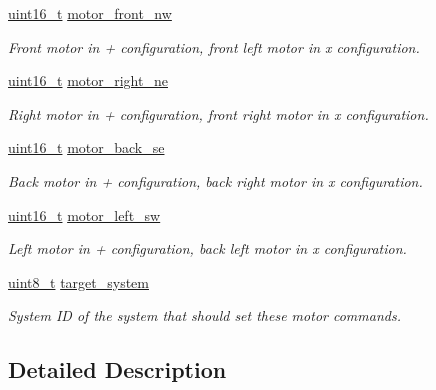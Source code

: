 \begin{DoxyCompactItemize}
\item 
\hyperlink{stdint_8h_a273cf69d639a59973b6019625df33e30}{uint16\-\_\-t} \hyperlink{struct____mavlink__set__quad__motors__setpoint__t_abc4491406798b03d54eec9ef0f4bd5d1}{motor\-\_\-front\-\_\-nw}
\begin{DoxyCompactList}\small\item\em Front motor in + configuration, front left motor in x configuration. \end{DoxyCompactList}\item 
\hyperlink{stdint_8h_a273cf69d639a59973b6019625df33e30}{uint16\-\_\-t} \hyperlink{struct____mavlink__set__quad__motors__setpoint__t_add9189ea075924d28bb0a4c04c04fcee}{motor\-\_\-right\-\_\-ne}
\begin{DoxyCompactList}\small\item\em Right motor in + configuration, front right motor in x configuration. \end{DoxyCompactList}\item 
\hyperlink{stdint_8h_a273cf69d639a59973b6019625df33e30}{uint16\-\_\-t} \hyperlink{struct____mavlink__set__quad__motors__setpoint__t_af5975aa67474104310c00bfba17f9dc1}{motor\-\_\-back\-\_\-se}
\begin{DoxyCompactList}\small\item\em Back motor in + configuration, back right motor in x configuration. \end{DoxyCompactList}\item 
\hyperlink{stdint_8h_a273cf69d639a59973b6019625df33e30}{uint16\-\_\-t} \hyperlink{struct____mavlink__set__quad__motors__setpoint__t_adf7327b8cd6bb3e73e6aaeaea75d639c}{motor\-\_\-left\-\_\-sw}
\begin{DoxyCompactList}\small\item\em Left motor in + configuration, back left motor in x configuration. \end{DoxyCompactList}\item 
\hyperlink{stdint_8h_aba7bc1797add20fe3efdf37ced1182c5}{uint8\-\_\-t} \hyperlink{struct____mavlink__set__quad__motors__setpoint__t_aeb391e4974804e204d36803d9ba51001}{target\-\_\-system}
\begin{DoxyCompactList}\small\item\em System I\-D of the system that should set these motor commands. \end{DoxyCompactList}\end{DoxyCompactItemize}


\subsection{Detailed Description}


